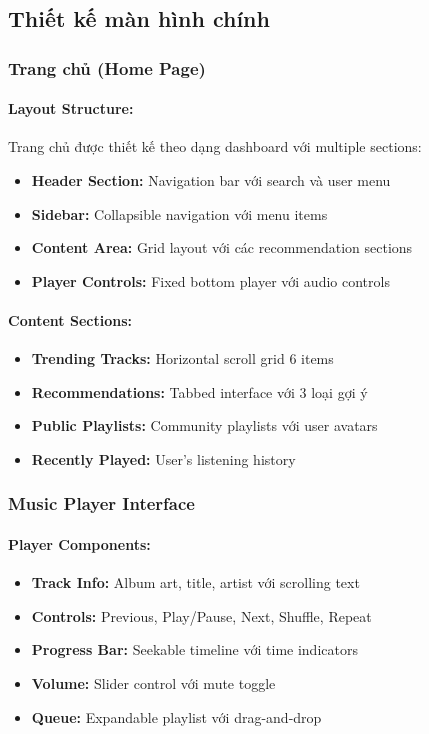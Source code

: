 \subsection{Thiết kế màn hình chính}

\subsubsection{Trang chủ (Home Page)}

\paragraph{Layout Structure:}
Trang chủ được thiết kế theo dạng dashboard với multiple sections:

\begin{itemize}
    \item \textbf{Header Section:} Navigation bar với search và user menu
    \item \textbf{Sidebar:} Collapsible navigation với menu items
    \item \textbf{Content Area:} Grid layout với các recommendation sections
    \item \textbf{Player Controls:} Fixed bottom player với audio controls
\end{itemize}

\paragraph{Content Sections:}
\begin{itemize}
    \item \textbf{Trending Tracks:} Horizontal scroll grid 6 items
    \item \textbf{Recommendations:} Tabbed interface với 3 loại gợi ý
    \item \textbf{Public Playlists:} Community playlists với user avatars
    \item \textbf{Recently Played:} User's listening history
\end{itemize}

\subsubsection{Music Player Interface}

\paragraph{Player Components:}
\begin{itemize}
    \item \textbf{Track Info:} Album art, title, artist với scrolling text
    \item \textbf{Controls:} Previous, Play/Pause, Next, Shuffle, Repeat
    \item \textbf{Progress Bar:} Seekable timeline với time indicators
    \item \textbf{Volume:} Slider control với mute toggle
    \item \textbf{Queue:} Expandable playlist với drag-and-drop
\end{itemize}

